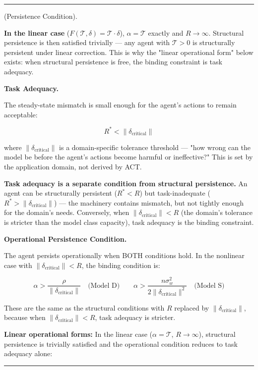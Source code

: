 \documentclass[11pt,oneside]{article}
\newcounter{claim}[section]
\renewcommand{\theclaim}{\thesection.\arabic{claim}}
\newenvironment{segment}[2]{%
  \refstepcounter{claim}%
  \bigskip\noindent\hrule\smallskip
  \noindent{\bfseries #1~\theclaim}\enskip(#2).\par\smallskip
  \noindent\ignorespaces
}{%
  \par\smallskip\noindent\hrule\bigskip
}
\newenvironment{theorem}[1][]{\begin{segment}{Theorem}{#1}}{\end{segment}}
\begin{document}
\begin{theorem}[Persistence Condition]
\textbf{In the linear case} ($F(\mathcal{T}, \delta) = \mathcal{T} \cdot \delta$), $\alpha = \mathcal{T}$ exactly and $R \to \infty$. Structural persistence is then satisfied trivially — any agent with $\mathcal{T} > 0$ is structurally persistent under linear correction. This is why the "linear operational form" below exists: when structural persistence is free, the binding constraint is task adequacy.


\medskip\noindent\textbf{Task Adequacy.}



The steady-state mismatch is small enough for the agent's actions to remain acceptable:

$$R^* < \lVert\delta_{\text{critical}}\rVert$$

where $\lVert\delta_{\text{critical}}\rVert$ is a domain-specific tolerance threshold — "how wrong can the model be before the agent's actions become harmful or ineffective?" This is set by the application domain, not derived by ACT.

\textbf{Task adequacy is a separate condition from structural persistence.} An agent can be structurally persistent ($R^* < R$) but task-inadequate ($R^* > \lVert\delta_{\text{critical}}\rVert$) — the machinery contains mismatch, but not tightly enough for the domain's needs. Conversely, when $\lVert\delta_{\text{critical}}\rVert < R$ (the domain's tolerance is stricter than the model class capacity), task adequacy is the binding constraint.


\medskip\noindent\textbf{Operational Persistence Condition.}



The agent persists operationally when BOTH conditions hold. In the nonlinear case with $\lVert\delta_{\text{critical}}\rVert < R$, the binding condition is:

$$\alpha > \frac{\rho}{\lVert\delta_{\text{critical}}\rVert} \quad \text{(Model D)} \qquad \alpha > \frac{n\sigma_w^2}{2\lVert\delta_{\text{critical}}\rVert^2} \quad \text{(Model S)}$$

These are the same as the structural conditions with $R$ replaced by $\lVert\delta_{\text{critical}}\rVert$, because when $\lVert\delta_{\text{critical}}\rVert < R$, task adequacy is stricter.

\textbf{Linear operational forms:} In the linear case ($\alpha = \mathcal{T}$, $R \to \infty$), structural persistence is trivially satisfied and the operational condition reduces to task adequacy alone:


\end{theorem}
\end{document}
